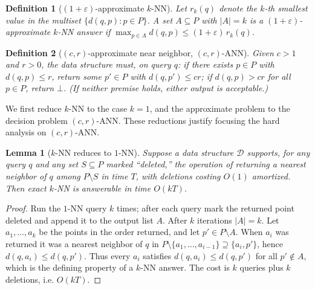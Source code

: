 \documentclass{amsart}
\newtheorem{lemma}{Lemma}
\newtheorem{definition}{Definition}
\newcommand{\eps}{\varepsilon}
\begin{document}
\begin{definition}[$(1+\eps)$-approximate $k$-NN]
Let $r_k(q)$ denote the $k$-th smallest value in the multiset $\{d(q,p):p\in P\}$.
A set $A\subseteq P$ with $|A|=k$ is a \emph{$(1+\eps)$-approximate $k$-NN answer} if
$\max_{p\in A} d(q,p)\le (1+\eps)\,r_k(q)$.
\end{definition}

\begin{definition}[$(c,r)$-approximate near neighbor, $(c,r)$-ANN]
Given $c>1$ and $r>0$, the data structure must, on query $q$:
if there exists $p\in P$ with $d(q,p)\le r$, return some $p'\in P$ with
$d(q,p')\le cr$; if $d(q,p)>cr$ for all $p\in P$, return $\bot$.
(If neither premise holds, either output is acceptable.)
\end{definition}

We first reduce $k$-NN to the case $k=1$, and the approximate problem to the decision
problem $(c,r)$-ANN.  These reductions justify focusing the hard analysis on
$(c,r)$-ANN.

\begin{lemma}[$k$-NN reduces to $1$-NN]\label{lem:ktoone}
Suppose a data structure $\mathcal D$ supports, for any query $q$ and any set
$S\subseteq P$ marked ``deleted,'' the operation of returning a nearest neighbor of
$q$ among $P\setminus S$ in time $T$, with deletions costing $O(1)$ amortized.
Then exact $k$-NN is answerable in time $O(kT)$.
\end{lemma}
\begin{proof}
Run the $1$-NN query $k$ times; after each query mark the returned point deleted and
append it to the output list $A$.  After $k$ iterations $|A|=k$.  Let $a_1,\dots,a_k$
be the points in the order returned, and let $p'\in P\setminus A$.  When $a_i$ was
returned it was a nearest neighbor of $q$ in
$P\setminus\{a_1,\dots,a_{i-1}\}\supseteq\{a_i,p'\}$, hence $d(q,a_i)\le d(q,p')$.
Thus every $a_i$ satisfies $d(q,a_i)\le d(q,p')$ for all $p'\notin A$, which is the
defining property of a $k$-NN answer.  The cost is $k$ queries plus $k$ deletions,
i.e. $O(kT)$.
\end{proof}
\end{document}
